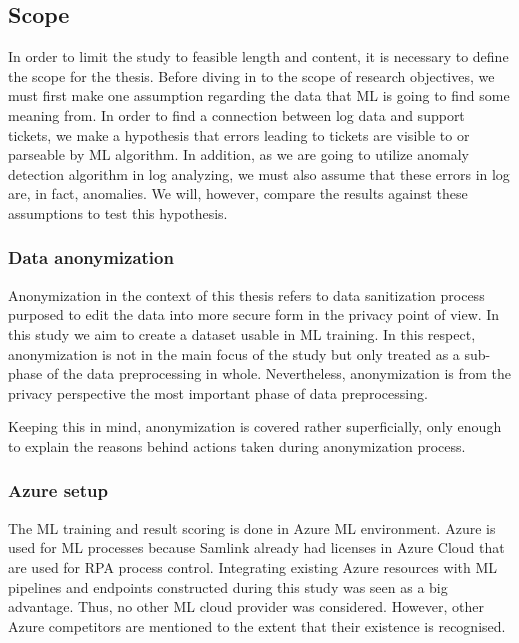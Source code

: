 \subsection{Scope}\label{subsec:intro-scope}

In order to limit the study
to feasible length and content,
it is necessary to define the scope for the thesis.
Before diving in to the scope of research objectives,
we must first make one assumption regarding the data
that ML is going to find some meaning from.
In order to find a connection between log data and support tickets,
we make a hypothesis that errors leading to tickets
are visible to or parseable by ML algorithm.
In addition,
as we are going to utilize anomaly detection algorithm in log analyzing,
we must also assume that these errors in log
are, in fact, anomalies.
We will, however,
compare the results against these assumptions
to test this hypothesis.


\subsubsection*{Data anonymization}
Anonymization in the context of this thesis
refers to data sanitization process
purposed to edit the data into
more secure form in the privacy point of view.
In this study
we aim to create a dataset usable in ML training.
In this respect,
anonymization is not in the main focus of the study
but only treated as a sub-phase
of the data preprocessing in whole.
Nevertheless,
anonymization is from the privacy perspective
the most important phase of data preprocessing.

Keeping this in mind,
anonymization is covered rather superficially,
only enough to explain the reasons
behind actions taken during anonymization process.


\subsubsection*{Azure setup}
The ML training and result scoring
is done in Azure ML environment.
Azure is used for ML processes
because Samlink already had licenses in Azure Cloud
that are used for RPA process control.
Integrating existing Azure resources
with ML pipelines and endpoints constructed during this study
was seen as a big advantage.
Thus,
no other ML cloud provider was considered.
However,
other Azure competitors are mentioned to the extent
that their existence is recognised.

